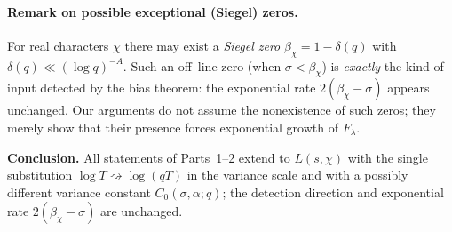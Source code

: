 \paragraph{Remark on possible exceptional (Siegel) zeros.}
For real characters $\chi$ there may exist a \emph{Siegel zero}
$\beta_\chi=1-\delta(q)$ with $\delta(q)\ll (\log q)^{-A}$. Such an off–line zero
(when $\sigma<\beta_\chi$) is \emph{exactly} the kind of input detected by the
bias theorem: the exponential rate $2(\beta_\chi-\sigma)$ appears unchanged.
Our arguments do not assume the nonexistence of such zeros; they merely show that
their presence forces exponential growth of $F_\lambda$.

\medskip
\noindent
\textbf{Conclusion.}
All statements of Parts~1–2 extend to $L(s,\chi)$ with the single substitution
$\log T\rightsquigarrow \log(qT)$ in the variance scale and with a possibly different
variance constant $C_0(\sigma,\alpha;q)$; the detection direction and exponential
rate $2(\beta_\chi-\sigma)$ are unchanged.

